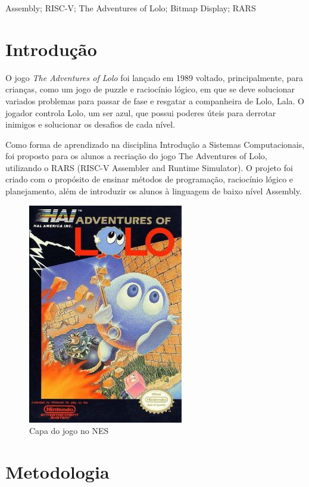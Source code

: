 \documentclass[10pt, conference, compsocconf]{IEEEtran}
\begin{document}
\begin{IEEEkeywords}
Assembly; RISC-V; The Adventures of Lolo; Bitmap Display; RARS
\end{IEEEkeywords}


\section{Introdução}
\label{sec:introducao}

O jogo \textit{The Adventures of Lolo} foi lançado em 1989 voltado, principalmente, para crianças, como um jogo de puzzle e raciocínio lógico, em que se deve solucionar variados problemas para passar de fase e resgatar a companheira de Lolo, Lala. O jogador controla Lolo, um ser azul, que possui poderes úteis para derrotar inimigos e solucionar os desafios de cada nível.

Como forma de aprendizado na disciplina Introdução a Sistemas Computacionais, foi proposto para os alunos a recriação do jogo The Adventures of Lolo, utilizando o RARS (RISC-V Assembler and Runtime Simulator). O projeto foi criado com o propósito de ensinar métodos de programação, raciocínio lógico e planejamento, além de introduzir os alunos à linguagem de baixo nível Assembly.

\begin{figure}[htb]
  \begin{center}
   \includegraphics[width=0.3\linewidth]{./Figures/capa_lolo_nes.png}
  \end{center}
  \caption{Capa do jogo no NES}
  \label{fig:01}
\end{figure}

\section{Metodologia}
\label{sec:Metodologia}
\end{document}

